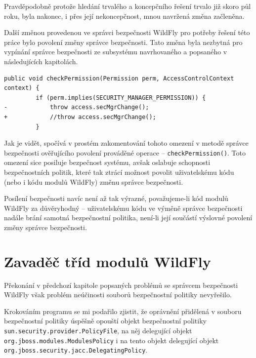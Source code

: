 Pravděpodobně protože hledání trvalého a koncepčního řešení trvalo již skoro půl roku, byla nakonec, i přes její nekoncepčnost, mnou navržená změna začleněna. \cite{smPullRequest}\cite{smPullRequestImpl}

Další změnou provedenou ve správci bezpečnosti WildFly pro potřeby řešení této práce bylo povolení změny správce bezpečnosti. Tato změna byla nezbytná pro vypínání správce bezpečnosti ze subsystému navrhovaného a popsaného v následujících kapitolách.

\begin{lstlisting}[caption=Záplata správce bezpečnosti WildFly umožňující vypnutí správce bezpečnosti (zkráceno), label=patchSM]
     public void checkPermission(Permission perm, AccessControlContext context) {
         if (perm.implies(SECURITY_MANAGER_PERMISSION)) {
-            throw access.secMgrChange();
+            //throw access.secMgrChange();
         }
\end{lstlisting}

Jak je vidět, spočívá v prostém zakomentování tohoto omezení v metodě správce bezpečnosti ověřujícího povolení prováděné operace -- {\tt checkPermission()}. Toto omezení sice posiluje bezpečnost systému, avšak oslabuje schopnosti bezpečnostních politik, které tak ztrácí možnost povolit uživatelskému kódu (nebo i kódu modulů WildFly) změnu správce bezpečnosti.

Posílení bezpečnosti navíc není až tak výrazné, považujeme-li kód modulů WildFly za důvěryhodný -- uživatelskému kódu ve výměně správce bezpečnosti nadále brání samotná bezpečnostní politika, není-li její součástí výslovné povolení změny správce bezpečnosti.

\section{Zavaděč tříd modulů WildFly} \label{moduleClassLoader}

Překonání v předchozí kapitole popsaných problémů se správcem bezpečnosti WildFly však problém neúčinosti souborů bezpečnostní politiky nevyřešilo.

Krokováním programu se mi podařilo zjistit, že oprávnění přidělená v souboru bezpečnostní politiky úspěšně opouští objekt bezpečnostní politiky {\tt sun.security.provider.PolicyFile}, na něj delegující objekt {\tt org.jboss.modules.ModulesPolicy} i na tento objekt delegující objekt {\tt org.jboss.security.jacc.DelegatingPolicy}.


